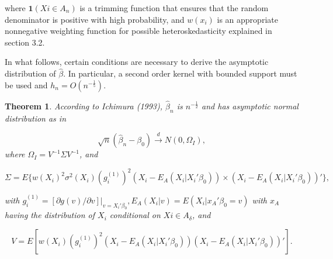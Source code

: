 \documentclass[a4paper]{article}
\begin{document}
where $\mathbf{1}{(Xi \in A_n)}$ is a trimming function that ensures that the random denominator is positive with high probability, and $w(x_i)$ is an appropriate nonnegative weighting function for possible heteroskedasticity explained in section 3.2. 

In what follows, certain conditions are necessary to derive the asymptotic distribution of $\hat{\beta}$. In particular, a second order kernel with bounded support must be used and $ h_n = O(n^{-\frac{1}{5}})$.

\newtheorem{theorem}{Theorem}[section]

\begin{theorem}
According to Ichimura (1993), $\hat{\beta}_{n}$ is $n^{-\frac{1}{2}}$ and has asymptotic normal distribution as in

	


\[ \sqrt{n}(\hat{\beta}_n - \beta_0) \stackrel{d}{\rightarrow} N(0,\Omega_I), \] where $\Omega_I = V^{-1}\Sigma V^{-1}$, and

\[\Sigma = E\{w(X_i)^2\sigma^2(X_i)(g_i^{(1)})^2(X_i - E_A(X_i|X_i'\beta_0)) \times (X_i - E_A(X_i|X_i'\beta_0))'\},\]

with $g_i^{(1)} = [\partial g(v)/\partial v]|_{v = X_i'\beta_0}, E_A(X_i|v) = E(X_i|x_A'\beta_0 = v)$ with $x_A$ having the distribution of $X_i$ conditional on $Xi \in A_\delta$, and

\[ V = E[w(X_i)(g_i^{(1)})^2(X_i - E_A(X_i|X_i'\beta_0))(X_i - E_A(X_i|X_i'\beta_0))'].\]

\end{theorem}
\end{document}

